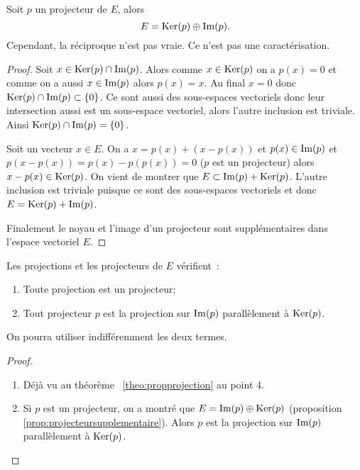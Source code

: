\begin{prop}\label{prop:projecteursupplementaire}
  Soit \(p\) un projecteur de \(E\), alors
  \begin{equation}
    E = \operatorname{Ker}(p) \oplus \operatorname{Im}(p).
  \end{equation}
  Cependant, la réciproque n'est pas vraie. Ce n'est pas une caractérisation.
\end{prop}
\begin{proof}
  Soit \(x \in \operatorname{Ker}(p) \cap \operatorname{Im}(p)\). Alors comme \(x \in \operatorname{Ker}(p)\) on a \(p(x)=0\) et comme on a aussi \(x \in \operatorname{Im}(p)\) alors \(p(x)=x\). Au final \(x = 0\) donc \(\operatorname{Ker}(p) \cap \operatorname{Im}(p) \subset \{0\}\). Ce sont aussi des sous-espaces vectoriels donc leur intersection aussi est un sous-espace vectoriel, alors l'autre inclusion est triviale. Ainsi \(\operatorname{Ker}(p) \cap \operatorname{Im}(p)=\{0\}\).

  Soit un vecteur \(x \in E\). On a \(x = p(x) +(x-p(x))\) et \(p(x) \in \operatorname{Im}(p)\) et \(p(x-p(x))=p(x)-p(p(x))=0\) (\(p\) est un projecteur) alors \(x-p(x) \in \operatorname{Ker}(p)\). On vient de montrer que \(E \subset \operatorname{Im}(p) + \operatorname{Ker}(p)\). L'autre inclusion est triviale puisque ce sont des sous-espaces vectoriels et donc \(E = \operatorname{Ker}(p) +\operatorname{Im}(p)\).

  Finalement le noyau et l'image d'un projecteur sont supplémentaires dans l'espace vectoriel \(E\).
\end{proof}

\begin{prop}
  Les projections et les projecteurs de \(E\) vérifient~:
  \begin{enumerate}
    \item Toute projection est un projecteur;
    \item Tout projecteur \(p\) est la projection sur \(\operatorname{Im}(p)\) parallèlement à \(\operatorname{Ker}(p)\).
  \end{enumerate}
  On pourra utiliser indifféremment les deux termes.
\end{prop}
\begin{proof}
  \begin{enumerate}
    \item Déjà vu au théorème~
      \ref{theo:propprojection} au point 4.
    \item Si \(p\) est un projecteur, on a montré que \(E = \operatorname{Im}(p) \oplus \operatorname{Ker}(p)\) (proposition~
      \ref{prop:projecteursupplementaire}). Alors \(p\) est la projection sur \(\operatorname{Im}(p)\) parallèlement à \(\operatorname{Ker}(p)\).
  \end{enumerate}
\end{proof}

